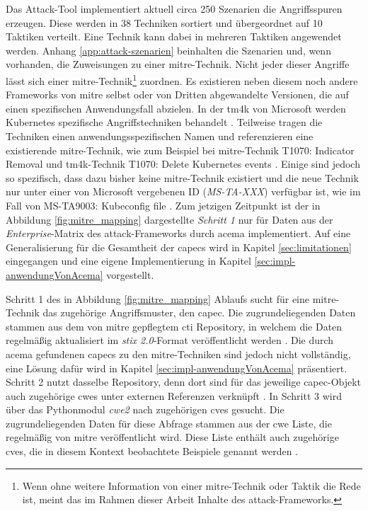\par Das Attack-Tool implementiert aktuell circa 250 Szenarien die Angriffsspuren erzeugen. Diese werden in 38 Techniken sortiert und übergeordnet auf 10 Taktiken verteilt. Eine Technik kann dabei in mehreren Taktiken angewendet werden. Anhang \ref{app:attack-szenarien} beinhalten die Szenarien und, wenn vorhanden, die Zuweisungen zu einer \gls{mitre}-Technik. Nicht jeder dieser Angriffe lässt sich einer \gls{mitre}-Technik\footnote{Wenn ohne weitere Information von einer \gls{mitre}-Technik oder Taktik die Rede ist, meint das im Rahmen dieser Arbeit Inhalte des \gls{attack}-Frameworks.} zuordnen. Es existieren neben diesem noch andere Frameworks von \gls{mitre} selbst oder von Dritten abgewandelte Versionen, die auf einen spezifischen Anwendungsfall abzielen. In der \glqq{}\gls{tm4k}\grqq{} von Microsoft werden Kubernetes spezifische Angriffstechniken behandelt \autocite{TacticsThreatMatrix}. Teilweise tragen die Techniken einen anwendungsspezifischen Namen und referenzieren eine existierende \gls{mitre}-Technik, wie zum Beispiel bei \gls{mitre}-Technik \glqq{}T1070: Indicator Removal\grqq{} und \gls{tm4k}-Technik \glqq{}T1070: Delete Kubernetes events\grqq{} \autocite{IndicatorRemovalTechnique} \autocite{DeleteKubernetesEvents}. Einige sind jedoch so spezifisch, dass dazu bisher keine \gls{mitre}-Technik existiert und die neue Technik nur unter einer von Microsoft vergebenen ID (\textit{MS-TA-XXX}) verfügbar ist, wie im Fall von \glqq{}MS-TA9003: Kubeconfig file\grqq{} \autocite{KubeconfigFileThreat}. Zum jetzigen Zeitpunkt ist der in Abbildung \ref{fig:mitre_mapping} dargestellte \textit{Schritt 1} nur für Daten aus der \textit{Enterprise}-Matrix des \gls{attack}-Frameworks durch \gls{acema} implementiert. Auf eine Generalisierung für die Gesamtheit der \glspl{capec} wird in Kapitel \ref{sec:limitationen} eingegangen und eine eigene Implementierung in Kapitel \ref{sec:impl-anwendungVonAcema} vorgestellt.
\par Schritt 1 des in Abbildung \ref{fig:mitre_mapping} Ablaufs sucht für eine \gls{mitre}-Technik das zugehörige Angriffsmuster, den \gls{capec}. Die zugrundeliegenden Daten stammen aus dem von \gls{mitre} gepflegtem \gls{cti} Repository, in welchem die Daten regelmäßig aktualisiert im \textit{\gls{stix} 2.0}-Format veröffentlicht werden \autocite{IntroductionSTIX} \autocite{MitreCtiCyber}. Die durch \gls{acema} gefundenen \glspl{capec} zu den \gls{mitre}-Techniken sind jedoch nicht vollständig, eine Lösung dafür wird in Kapitel \ref{sec:impl-anwendungVonAcema} präsentiert. Schritt 2 nutzt dasselbe Repository, denn dort sind für das jeweilige \gls{capec}-Objekt auch zugehörige \glspl{cwe} unter externen Referenzen verknüpft \autocite{CtiUSAGEmdMaster}. In Schritt 3 wird über das Pythonmodul \textit{cwe2} nach zugehörigen \glspl{cve} gesucht. Die zugrundeliegenden Daten für diese Abfrage stammen aus der \gls{cwe} Liste, die regelmäßig von \gls{mitre} veröffentlicht wird. Diese Liste enthält auch zugehörige \glspl{cve}, die in diesem Kontext \glqq{}beobachtete Beispiele\grqq{} genannt werden \autocite{AboutcodeorgCwe22024} \autocite{CWEDownloads}.
